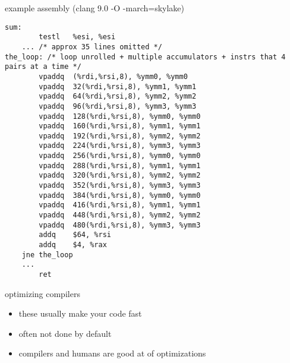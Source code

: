\begin{frame}[fragile,label=opt4]{example assembly (clang 9.0 -O -march=skylake)}
\lstset{language=myasm,style=script}
\begin{lstlisting}
sum:
        testl   %esi, %esi
	... /* approx 35 lines omitted */
the_loop: /* loop unrolled + multiple accumulators + instrs that 4 pairs at a time */
        vpaddq  (%rdi,%rsi,8), %ymm0, %ymm0
        vpaddq  32(%rdi,%rsi,8), %ymm1, %ymm1
        vpaddq  64(%rdi,%rsi,8), %ymm2, %ymm2
        vpaddq  96(%rdi,%rsi,8), %ymm3, %ymm3
        vpaddq  128(%rdi,%rsi,8), %ymm0, %ymm0
        vpaddq  160(%rdi,%rsi,8), %ymm1, %ymm1
        vpaddq  192(%rdi,%rsi,8), %ymm2, %ymm2
        vpaddq  224(%rdi,%rsi,8), %ymm3, %ymm3
        vpaddq  256(%rdi,%rsi,8), %ymm0, %ymm0
        vpaddq  288(%rdi,%rsi,8), %ymm1, %ymm1
        vpaddq  320(%rdi,%rsi,8), %ymm2, %ymm2
        vpaddq  352(%rdi,%rsi,8), %ymm3, %ymm3
        vpaddq  384(%rdi,%rsi,8), %ymm0, %ymm0
        vpaddq  416(%rdi,%rsi,8), %ymm1, %ymm1
        vpaddq  448(%rdi,%rsi,8), %ymm2, %ymm2
        vpaddq  480(%rdi,%rsi,8), %ymm3, %ymm3
        addq    $64, %rsi
        addq    $4, %rax
	jne the_loop
	... 
        ret
\end{lstlisting}
\end{frame}

\begin{frame}{optimizing compilers}
    \begin{itemize}
    \item these usually make your code fast
    \item often not done by default
    \item compilers and humans are good at  of optimizations
    \end{itemize}
\end{frame}

